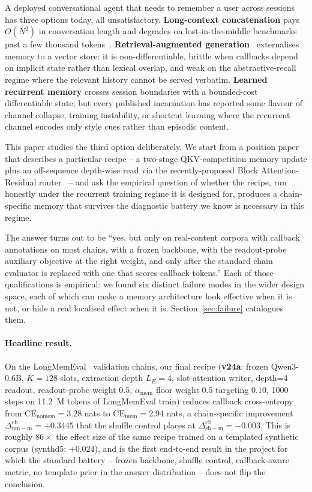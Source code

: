\documentclass[11pt]{article}
\newcommand{\dnm}{\Delta_{\mathrm{nm{-}m}}}
\newcommand{\dsh}{\Delta_{\mathrm{sh{-}m}}}
\newcommand{\CEmem}{\mathrm{CE}_{\mathrm{mem}}}
\newcommand{\CEnomem}{\mathrm{CE}_{\mathrm{nomem}}}
\newcommand{\amem}{\alpha_{\mathrm{mem}}}
\begin{document}
A deployed conversational agent that needs to remember a user across
sessions has three options today, all unsatisfactory.
\textbf{Long-context concatenation} pays $O(N^2)$ in conversation
length and degrades on lost-in-the-middle benchmarks past a few
thousand tokens~\citep{liu2024lostmiddle}.
\textbf{Retrieval-augmented generation}~\citep{lewis2020retrieval}
externalises memory to a vector store: it is non-differentiable,
brittle when callbacks depend on implicit state rather than lexical
overlap, and weak on the abstractive-recall regime where the relevant
history cannot be served verbatim.
\textbf{Learned recurrent memory} crosses session boundaries with a
bounded-cost differentiable state, but every published incarnation
\citep{bulatov2022rmt,hutchins2022blockrecurrent,wu2022memorising}
has reported some flavour of channel collapse, training instability,
or shortcut learning where the recurrent channel encodes only style
cues rather than episodic content.

This paper studies the third option deliberately. We start from a
position paper~\citep{liu2025memres} that describes a particular
recipe -- a two-stage QKV-competition memory update plus an
off-sequence depth-wise read via the recently-proposed Block
Attention-Residual router~\citep{du2026attention} -- and ask the
empirical question of whether the recipe, run honestly under the
recurrent training regime it is designed for, produces a chain-specific
memory that survives the diagnostic battery we know is necessary in
this regime.

The answer turns out to be ``yes, but only on real-content corpora with
callback annotations on most chains, with a frozen backbone, with the
readout-probe auxiliary objective at the right weight, and only after
the standard chain evaluator is replaced with one that scores callback
tokens.'' Each of those qualifications is empirical: we found six
distinct failure modes in the wider design space, each of which can
make a memory architecture look effective when it is not, or hide a
real localised effect when it is. Section~\ref{sec:failure} catalogues
them.

\paragraph{Headline result.}
On the LongMemEval~\citep{yu2025longmemeval} validation chains, our
final recipe (\textbf{v24a}: frozen Qwen3-0.6B, $K=128$ slots,
extraction depth $L_E=4$, slot-attention writer, depth=4 readout,
readout-probe weight $0.5$, $\amem$ floor weight $0.5$ targeting
$0.10$, 1000 steps on 11.2~M tokens of LongMemEval train) reduces
callback cross-entropy from $\CEnomem=3.28$ nats to
$\CEmem=2.94$ nats, a chain-specific improvement
$\dnm^{\mathrm{cb}}=+0.3445$ that the shuffle control places at
$\dsh^{\mathrm{cb}}=-0.003$. This is roughly $86\times$ the effect
size of the same recipe trained on a templated synthetic corpus
(synthd5: $+0.024$), and is the first end-to-end result in the
project for which the standard battery -- frozen backbone, shuffle
control, callback-aware metric, no template prior in the answer
distribution -- does not flip the conclusion.
\end{document}

